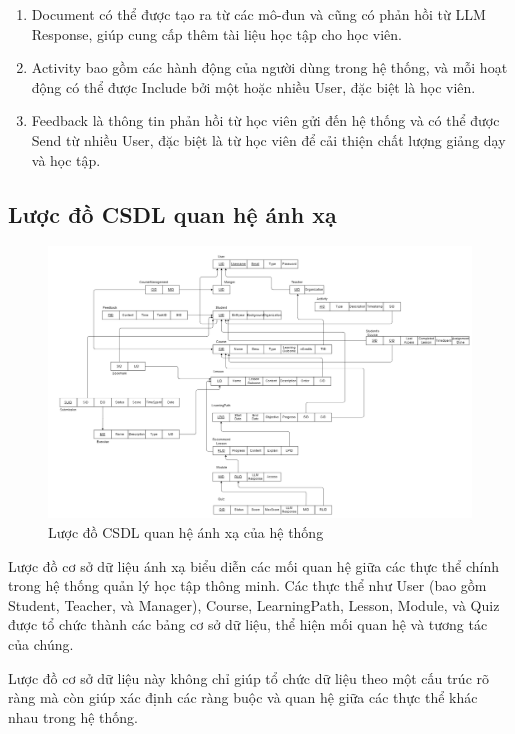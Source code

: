 \begin{enumerate}
    \item Document có thể được tạo ra từ các mô-đun và cũng có phản hồi từ LLM Response, giúp cung cấp thêm tài liệu học tập cho học viên.
    \item Activity bao gồm các hành động của người dùng trong hệ thống, và mỗi hoạt động có thể được Include bởi một hoặc nhiều User, đặc biệt là học viên.
    \item Feedback là thông tin phản hồi từ học viên gửi đến hệ thống và có thể được Send từ nhiều User, đặc biệt là từ học viên để cải thiện chất lượng giảng dạy và học tập.
\end{enumerate}
\newpage
\subsection{Lược đồ CSDL quan hệ ánh xạ}
\begin{figure}[h!]
    \centering
    \includegraphics[width=\linewidth]{Images/Anh/mapping.png}
    \caption{Lược đồ CSDL quan hệ ánh xạ của hệ thống}
    \label{fig:enter-label}
\end{figure}
Lược đồ cơ sở dữ liệu ánh xạ biểu diễn các mối quan hệ giữa các thực thể chính trong hệ thống quản lý học tập thông minh. Các thực thể như User (bao gồm Student, Teacher, và Manager), Course, LearningPath, Lesson, Module, và Quiz được tổ chức thành các bảng cơ sở dữ liệu, thể hiện mối quan hệ và tương tác của chúng.

Lược đồ cơ sở dữ liệu này không chỉ giúp tổ chức dữ liệu theo một cấu trúc rõ ràng mà còn giúp xác định các ràng buộc và quan hệ giữa các thực thể khác nhau trong hệ thống.
\newpage
